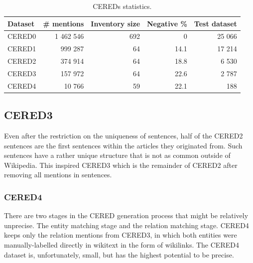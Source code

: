 \begin{table}

\caption{CEREDs statistics.}

\label{table01:S10T8}

\begin{tabular}{p{} r r r r }

\hline
Dataset & \# mentions & Inventory size & Negative \% & Test dataset\\
\hline
\hline
CERED0 & 1 462 546 & 692 & 0 & 25 066\\
CERED1 & 999 287 & 64 & 14.1 & 17 214\\
CERED2 & 374 914 & 64 & 18.8 & 6 530\\
CERED3 & 157 972 & 64 & 22.6 & 2 787\\
CERED4 & 10 766 & 59 & 22.1 & 188\\
\hline


\end{tabular}

\end{table}






\subsection{CERED3}
Even after the restriction on the uniqueness of sentences, half of the CERED2 sentences are the first sentences within the articles they originated from. Such sentences have a rather unique structure that is not as common outside of Wikipedia. This inspired CERED3 which is the remainder of CERED2 after removing all mentions in  sentences.

\subsubsection{CERED4}
There are two stages in the CERED generation process that might be relatively unprecise. The entity matching stage and the relation matching stage. CERED4 keeps only the relation mentions from CERED3, in which both entities were manually-labelled directly in wikitext in the form of wikilinks. The CERED4 dataset is, unfortunately, small, but has the highest potential to be precise.





